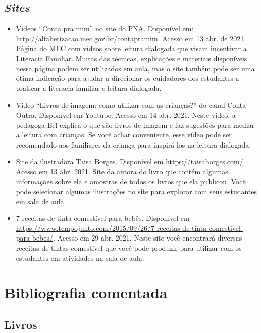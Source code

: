 \documentclass[11pt]{extarticle}
\begin{document}
\subsection{\textit{Sites}}

\begin{itemize}
\item Vídeos “Conta pra mim” no site do PNA. Disponível em: \url{http://alfabetizacao.mec.gov.br/contapramim}. 
Acesso em 13 abr. de 2021.
Página do MEC com vídeos sobre leitura dialogada que visam incentivar a Literacia Familiar. Muitas das 
técnicas, explicações e materiais disponíveis nessa página podem ser utilizados em aula, mas o site também 
pode ser uma ótima indicação para ajudar a direcionar os cuidadores dos estudantes a praticar 
a literacia familiar e leitura dialogada.

\item Vídeo “Livros de imagem: como utilizar com as crianças?” do canal Conta Outra. Disponível em Youtube. 
Acesso em 14 abr. 2021. 
Neste vídeo, a pedagoga Bel explica o que são livros de imagem e faz sugestões para mediar a leitura com 
crianças. Se você achar conveniente, esse vídeo pode ser recomendado aos familiares da criança 
para inspirá-los na leitura dialogada. 

\item Site da ilustradora Taisa Borges. Disponível em https://taisaborges.com/. Acesso em 13 abr. 2021. 
Site da autora do livro que contém algumas informações sobre ela e amostras de todos os livros que ela publicou. 
Você pode selecionar algumas ilustrações no site para explorar com seus estudantes em sala de aula. 

\item 7 receitas de tinta comestível para bebês. 
Disponível em \url{https://www.tempojunto.com/2015/09/26/7-receitas-de-tinta-comestivel-para-bebes/}. 
Acesso em 29 abr. 2021. 
Neste site você encontrará diversas receitas de tintas comestível que você pode produzir 
para utilizar com os estudantes em atividades na sala de aula. 
\end{itemize}


\section{Bibliografia comentada}

\subsection{Livros}
\end{document}
